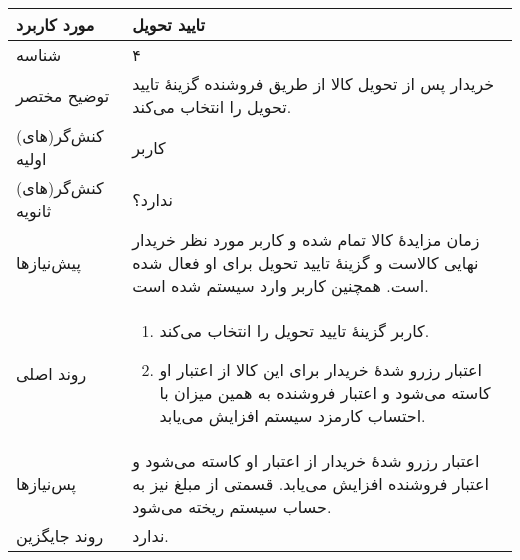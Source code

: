 \documentclass{article}
\begin{document}
\begin{center}
\bgroup
\def\arraystretch{1.5}
\begin{tabular} {|p{}|p{}|}
\hline
 مورد کاربرد & 
 تایید تحویل
\\ \hline
 شناسه &
۴
\\ \hline
توضیح مختصر &
خریدار پس از تحویل کالا از طریق فروشنده گزینهٔ تایید تحویل  را انتخاب می‌کند.
\\ \hline
کنش‌گر(های) اولیه &
کاربر
\\ \hline
کنش‌گر(های) ثانویه &
ندارد؟
\\ \hline
پیش‌نیازها &
زمان مزایدهٔ کالا تمام شده و کاربر مورد نظر خریدار نهایی کالاست و گزینهٔ تایید تحویل برای او فعال شده است. همچنین کاربر وارد سیستم شده است.
\\ \hline
روند اصلی &
\begin{enumerate}[nosep,topsep=0cm]
\item
کاربر گزینهٔ تایید تحویل را انتخاب می‌کند.
\item
اعتبار رزرو شدهٔ خریدار برای این کالا از اعتبار او کاسته می‌شود و اعتبار فروشنده به همین میزان با احتساب کارمزد سیستم افزایش می‌یابد.
\end{enumerate}
\\ \hline
پس‌نیازها &
اعتبار رزرو شدهٔ خریدار از اعتبار او کاسته می‌شود و اعتبار فروشنده افزایش می‌یابد. قسمتی از مبلغ نیز به حساب سیستم ریخته می‌شود.
\\ \hline
روند جایگزین &
ندارد.
\\ \hline
\end{tabular}
\egroup
\end{center}

\newpage
\end{document}
